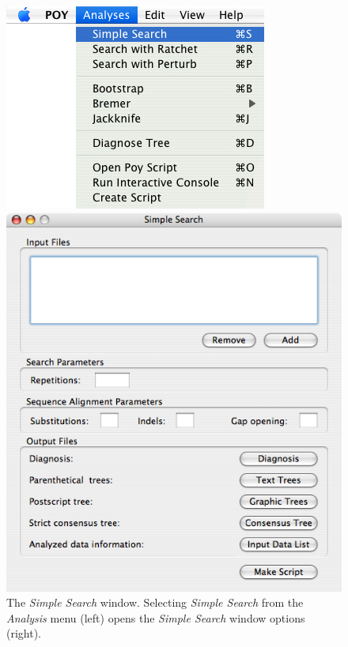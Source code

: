\begin{figure}
\centering
\begin{minipage}[c]{0.48\textwidth}
   		\includegraphics[width=\textwidth]{figures/simplesearch_menu.jpg}
\end{minipage}
\quad
\begin{minipage}[c]{0.48\textwidth}
	   	\includegraphics[width=\textwidth]{figures/simplesearch_window.jpg}
   	\end{minipage}
	
\caption{The \emph{Simple Search} window. Selecting \emph{Simple Search} from the \emph{Analysis} menu (left) opens the \emph{Simple Search} window options (right).}
\label{fig:simple_search_window}
\end{figure}

